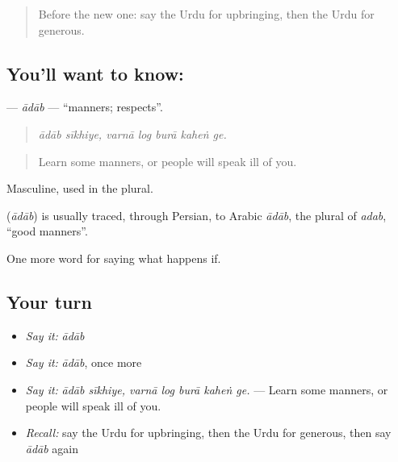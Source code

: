 \label{lesson:UR-C384-adab}



\begin{quote}
Before the new one: say the Urdu for upbringing, then the Urdu for generous.
\end{quote}

\subsection*{You'll want to know: }
\textbf{} — \emph{ādāb} — \textquotedblleft{}manners; respects\textquotedblright{}.

\begin{quote}
      
\end{quote}

\begin{quote}
\emph{ādāb sīkhiye, varnā log burā kaheṅ ge.}
\end{quote}

\begin{quote}
Learn some manners, or people will speak ill of you.
\end{quote}

Masculine, used in the plural.

\begin{cousinweb}
\textbf{} (\emph{ādāb}) is usually traced, through Persian, to Arabic \emph{ādāb}, the plural of \emph{adab}, \textquotedblleft{}good manners\textquotedblright{}.
\end{cousinweb}

\begin{grammarlens}[title={What you've built}]
One more word for saying what happens if.
\end{grammarlens}

\subsection*{Your turn}
\begin{itemize}
\raggedright
  \item \emph{Say it:} \emph{ādāb}
  \item \emph{Say it:} \emph{ādāb}, once more
  \item \emph{Say it:} \emph{ādāb sīkhiye, varnā log burā kaheṅ ge.} — Learn some manners, or people will speak ill of you.
  \item \emph{Recall:} say the Urdu for upbringing, then the Urdu for generous, then say \emph{ādāb} again
\end{itemize}

